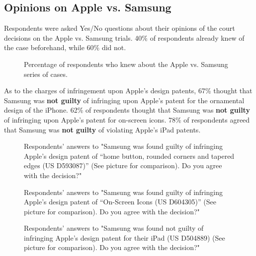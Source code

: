 \documentclass[prodmode,cs196]{acmlarge}
\begin{document}
\subsection{Opinions on Apple vs. Samsung}

Respondents were asked Yes/No questions about their opinions of the court decisions on the Apple vs. Samsung trials. 40\% of respondents already knew of the case beforehand, while 60\% did not.

\begin{figure}[H]
	\caption{Percentage of respondents who knew about the Apple vs. Samsung series of cases.}
\end{figure}


As to the charges of infringement upon Apple's design patents, 67\% thought that Samsung was \textbf{not guilty} of infringing upon Apple's patent for the ornamental design of the iPhone. 62\% of respondents thought that Samsung was \textbf{not guilty} of infringing upon Apple's patent for on-screen icons. 78\% of respondents agreed that Samsung was \textbf{not guilty} of violating Apple's iPad patents.

\begin{figure}[h]
	\caption{Respondents' answers to "Samsung was found guilty of infringing Apple’s design patent of “home button, rounded corners and tapered edges (US D593087)” (See picture for comparison). Do you agree with the decision?"}
\end{figure}

\begin{figure}[h]
	\caption{Respondents' answers to "Samsung was found guilty of infringing Apple’s design patent of “On-Screen Icons  (US D604305)” (See picture for comparison). Do you agree with the decision?"}
\end{figure}

\begin{figure}[H]
	\caption{Respondents' answers to "Samsung was found not guilty of infringing Apple’s design patent for their iPad (US D504889) (See picture for comparison). Do you agree with the decision?"}
\end{figure}
\end{document}
